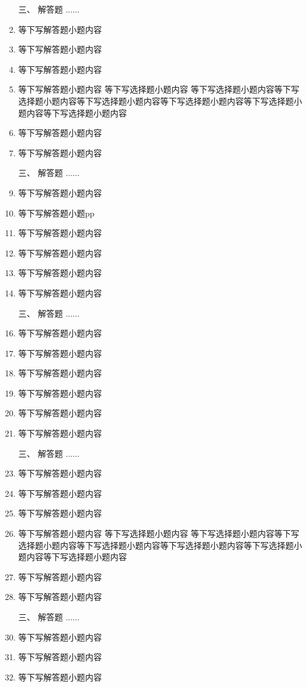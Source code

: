 \documentclass[12pt,twocolumn,landscape,UTF8,twoside]{ctexart}
\begin{document}
\begin{spacing}{1.3}
\begin{enumerate} [1、]
		\item[\heiti 三、] {\heiti 解答题  ......}
		\item 等下写解答题小题内容 
		\item 等下写解答题小题内容 
		\item 等下写解答题小题内容 
		\item 等下写解答题小题内容 等下写选择题小题内容 等下写选择题小题内容等下写选择题小题内容等下写选择题小题内容等下写选择题小题内容等下写选择题小题内容等下写选择题小题内容
		\item 等下写解答题小题内容 
		\item 等下写解答题小题内容  		
		\item[\heiti 三、] {\heiti 解答题  ......}
		\item 等下写解答题小题内容 
		\item 等下写解答题小题pp
		\item 等下写解答题小题内容 \pd{}
		\item 等下写解答题小题内容 \pd{}
		\item 等下写解答题小题内容 \pd{}
		\item 等下写解答题小题内容  		\pd{}
		\item[\heiti 三、] {\heiti 解答题  ......}
		\item 等下写解答题小题内容 \pd{}
		\item 等下写解答题小题内容 \pd{}
		\item 等下写解答题小题内容 \pd{}
		\item 等下写解答题小题内容 \pd{}
		\item 等下写解答题小题内容 \pd{}
		\item 等下写解答题小题内容  		\pd{}
		\item[\heiti 三、] {\heiti 解答题  ......}
		\item 等下写解答题小题内容 
		\item 等下写解答题小题内容 
		\item 等下写解答题小题内容 
		\item 等下写解答题小题内容 等下写选择题小题内容 等下写选择题小题内容等下写选择题小题内容等下写选择题小题内容等下写选择题小题内容等下写选择题小题内容等下写选择题小题内容
		\item 等下写解答题小题内容 
		\item 等下写解答题小题内容  		
		\item[\heiti 三、] {\heiti 解答题  ......}
		\item 等下写解答题小题内容 
		\item 等下写解答题小题内容 
		\item 等下写解答题小题内容 

\end{enumerate}
\end{spacing}
\end{document}
